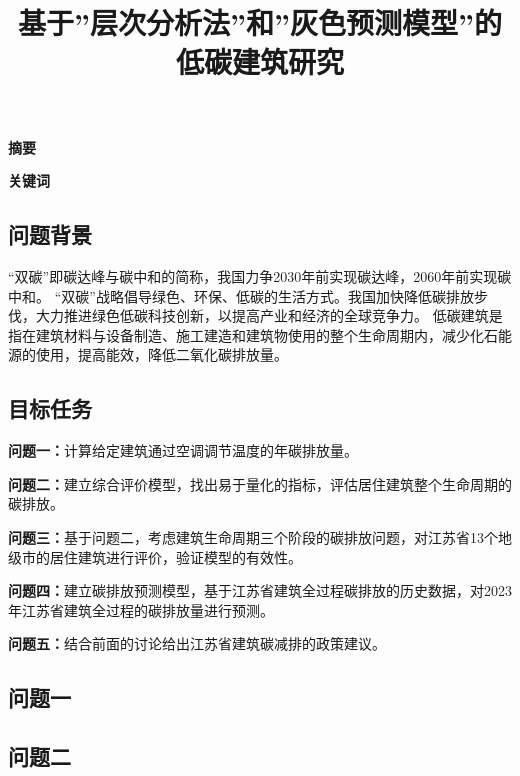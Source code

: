 \documentclass[a4paper, 12pt]{article}
\numberwithin{equation}{section}
\begin{document}
    \title{基于''层次分析法''和''灰色预测模型''的低碳建筑研究}
    \author{}
    \date{}
    \maketitle

    \centerline{\textbf{\LARGE{摘要}}}

    \textbf{\large{关键词}}

    {}
        \subsection{问题背景}
        “双碳”即碳达峰与碳中和的简称，我国力争2030年前实现碳达峰，2060年前实现碳中和。
        “双碳”战略倡导绿色、环保、低碳的生活方式。我国加快降低碳排放步伐，大力推进绿色低碳科技创新，以提高产业和经济的全球竞争力。
        低碳建筑是指在建筑材料与设备制造、施工建造和建筑物使用的整个生命周期内，减少化石能源的使用，提高能效，降低二氧化碳排放量。

        \subsection{目标任务}
            \textbf{问题一：}计算给定建筑通过空调调节温度的年碳排放量。

            \textbf{问题二：}建立综合评价模型，找出易于量化的指标，评估居住建筑整个生命周期的碳排放。

            \textbf{问题三：}基于问题二，考虑建筑生命周期三个阶段的碳排放问题，对江苏省13个地级市的居住建筑进行评价，验证模型的有效性。

            \textbf{问题四：}建立碳排放预测模型，基于江苏省建筑全过程碳排放的历史数据，对2023年江苏省建筑全过程的碳排放量进行预测。

            \textbf{问题五：}结合前面的讨论给出江苏省建筑碳减排的政策建议。


    {}
        \subsection{问题一}

        \subsection{问题二}
\end{document}
